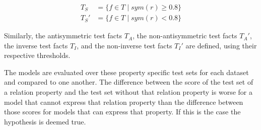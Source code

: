 \begin{equation}
\begin{aligned}
T_S & = \{ f \in T \mid \mathit{sym}(r) \geq 0.8 \}\\
T_S' & = \{ f \in T \mid \mathit{sym}(r) < 0.8 \}
\end{aligned}
\end{equation}

\noindent
Similarly, the antisymmetric test facts $T_A$, the non-antisymmetric test facts $T_A'$, the inverse test facts $T_I$, and the non-inverse test facts $T_I'$ are defined, using their respective thresholds.

The models are evaluated over these property specific test sets for each dataset and compared to one another. 
The difference between the score of the test set of a relation property and the test set without that relation property is worse for a model that cannot express that relation property than the difference between those scores for models that can express that property.
If this is the case the hypothesis is deemed true.